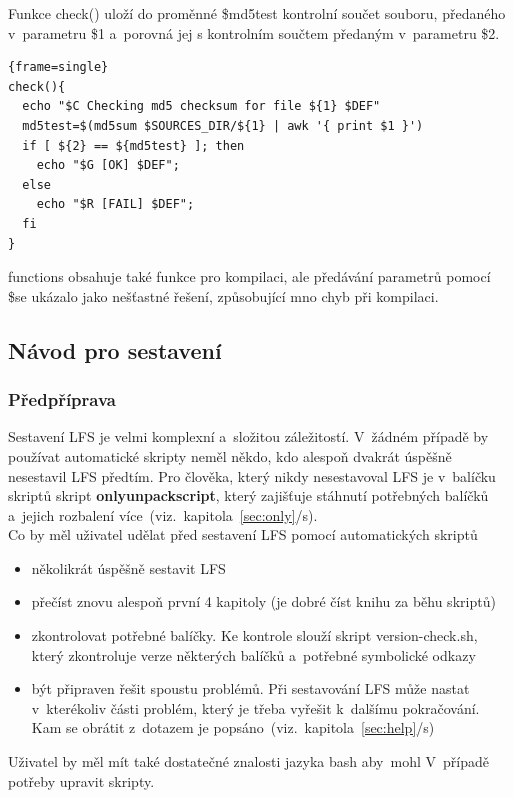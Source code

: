 \documentclass[a4paper,12pt]{article}
\newcommand{\odkazNaKapitolu}[1]{(viz.~kapitola~\ref{#1}/s\pageref{#1})}
\renewcommand{\b}[1]{\textbf{#1}} %
\newenvironment{codeframe}{%
  \begin{Sbox} 
    \begin{minipage} 
      {\columnwidth-\leftmargin-\rightmargin-2\fboxsep-2\fboxrule-4pt} 
}{%

  \end{minipage} 
  \end{Sbox} 
  \begin{center} 
    \fcolorbox{black}{codeback}{\TheSbox} 
  \end{center} 
}
\begin{document}
Funkce check() uloží do proměnné \$md5test kontrolní součet souboru, předaného v~parametru \$1 a~porovná jej s kontrolním součtem předaným v~parametru \$2.
\label{func:md5}
    \begin{codeframe} 
\begin{Verbatim}{frame=single} 
check(){
  echo "$C Checking md5 checksum for file ${1} $DEF"
  md5test=$(md5sum $SOURCES_DIR/${1} | awk '{ print $1 }')
  if [ ${2} == ${md5test} ]; then
    echo "$G [OK] $DEF";
  else
    echo "$R [FAIL] $DEF";
  fi
}
\end{Verbatim} 
    \end{codeframe}

functions obsahuje také funkce pro kompilaci, ale předávání parametrů pomocí \$\@ se ukázalo jako nešťastné řešení, způsobující mno chyb při kompilaci.

\subsection{Návod pro sestavení}
\subsubsection{Předpříprava}
Sestavení LFS je velmi komplexní a~složitou záležitostí. V~žádném případě by používat automatické skripty neměl někdo, kdo alespoň dvakrát úspěšně nesestavil LFS předtím. Pro člověka, který nikdy nesestavoval LFS je v~balíčku skriptů skript \b{onlyunpackscript}, který zajišťuje stáhnutí potřebných balíčků a~jejich rozbalení více~\odkazNaKapitolu{sec:only}.\\

Co by měl uživatel udělat před sestavení LFS pomocí automatických skriptů
\begin{itemize}
 \item několikrát úspěšně sestavit LFS
 \item přečíst znovu alespoň první 4 kapitoly (je dobré číst knihu za běhu skriptů)
 \item zkontrolovat potřebné balíčky. Ke kontrole slouží skript version-check.sh, který zkontroluje verze některých balíčků a~potřebné symbolické odkazy
 \item být připraven řešit spoustu problémů. Při sestavování LFS může nastat v~kterékoliv části problém, který je třeba vyřešit k~dalšímu pokračování. Kam se obrátit z~dotazem je popsáno~\odkazNaKapitolu{sec:help}
\end{itemize}

Uživatel by měl mít také dostatečné znalosti jazyka bash aby~mohl V~případě potřeby upravit skripty.
\end{document}
